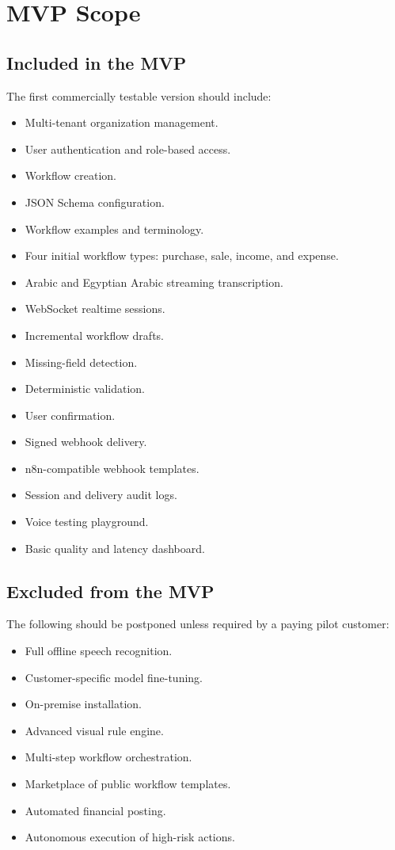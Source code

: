 \documentclass[11pt,a4paper]{article}
\begin{document}
\section{MVP Scope}

\subsection{Included in the MVP}

The first commercially testable version should include:

\begin{itemize}
\item Multi-tenant organization management.
\item User authentication and role-based access.
\item Workflow creation.
\item JSON Schema configuration.
\item Workflow examples and terminology.
\item Four initial workflow types:
purchase, sale, income, and expense.
\item Arabic and Egyptian Arabic streaming transcription.
\item WebSocket realtime sessions.
\item Incremental workflow drafts.
\item Missing-field detection.
\item Deterministic validation.
\item User confirmation.
\item Signed webhook delivery.
\item n8n-compatible webhook templates.
\item Session and delivery audit logs.
\item Voice testing playground.
\item Basic quality and latency dashboard.
\end{itemize}

\subsection{Excluded from the MVP}

The following should be postponed unless required by a paying pilot
customer:

\begin{itemize}
\item Full offline speech recognition.
\item Customer-specific model fine-tuning.
\item On-premise installation.
\item Advanced visual rule engine.
\item Multi-step workflow orchestration.
\item Marketplace of public workflow templates.
\item Automated financial posting.
\item Autonomous execution of high-risk actions.
\end{itemize}
\end{document}
